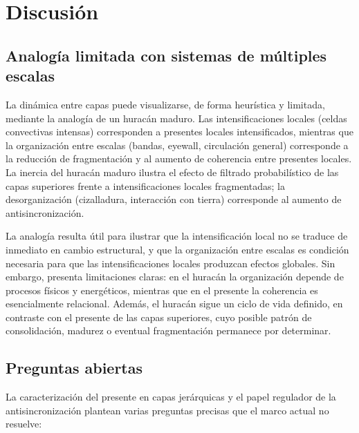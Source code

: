 \section{Discusión}

\subsection{Analogía limitada con sistemas de múltiples escalas}

La dinámica entre capas puede visualizarse, de forma heurística y limitada, mediante la analogía de un huracán maduro. Las intensificaciones locales (celdas convectivas intensas) corresponden a presentes locales intensificados, mientras que la organización entre escalas (bandas, eyewall, circulación general) corresponde a la reducción de fragmentación y al aumento de coherencia entre presentes locales. La inercia del huracán maduro ilustra el efecto de filtrado probabilístico de las capas superiores frente a intensificaciones locales fragmentadas; la desorganización (cizalladura, interacción con tierra) corresponde al aumento de antisincronización.

La analogía resulta útil para ilustrar que la intensificación local no se traduce de inmediato en cambio estructural, y que la organización entre escalas es condición necesaria para que las intensificaciones locales produzcan efectos globales. Sin embargo, presenta limitaciones claras: en el huracán la organización depende de procesos físicos y energéticos, mientras que en el presente la coherencia es esencialmente relacional. Además, el huracán sigue un ciclo de vida definido, en contraste con el presente de las capas superiores, cuyo posible patrón de consolidación, madurez o eventual fragmentación permanece por determinar.

\subsection{Preguntas abiertas}

La caracterización del presente en capas jerárquicas y el papel regulador de la antisincronización plantean varias preguntas precisas que el marco actual no resuelve:

